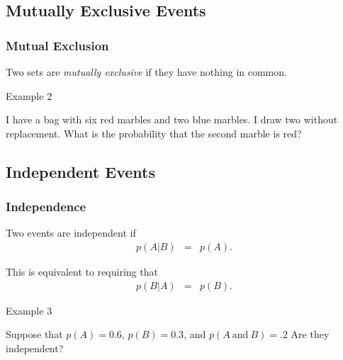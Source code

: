 \subsection{Mutually Exclusive Events}

\begin{frame}
  \frametitle{Mutual Exclusion}

  \begin{definition}
    Two sets are \textit{mutually exclusive} if they have nothing in
    common.
  \end{definition}

\end{frame}


\begin{frame}{Example 2}
  
  I have a bag with six red marbles and two blue marbles. I draw two
  without replacement. What is the probability that the second marble
  is red?

  \vfill

\end{frame}

\subsection{Independent Events}

\begin{frame}
  \frametitle{Independence}

  \begin{definition}
    Two events are independent if 
    \begin{eqnarray*}
      p(A|B) & = & p(A).
    \end{eqnarray*}

    This is equivalent to requiring that
    \begin{eqnarray*}
      p(B|A) & = & p(B).
    \end{eqnarray*}

  \end{definition}

\end{frame}



\begin{frame}{Example 3}

  Suppose that $p(A)=0.6$, $p(B)=0.3$, and $p(A\mathrm{~and~}B)=.2$
  Are they independent?

  \vfill

  
\end{frame}



